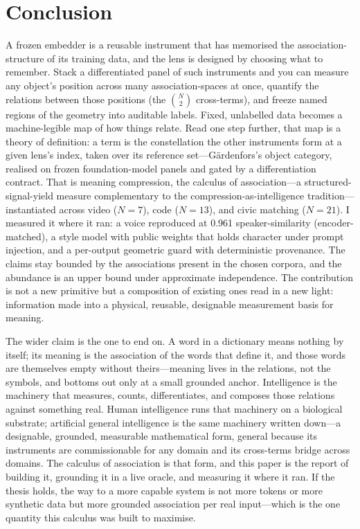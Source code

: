 \documentclass[10pt,twocolumn]{article}
\begin{document}
\section{Conclusion}
A frozen embedder is a reusable instrument that has memorised the
association-structure of its training data, and the lens is designed by choosing
what to remember. Stack a differentiated panel of such instruments and you can
measure any object's position across many association-spaces at once, quantify the
relations between those positions (the $\binom{N}{2}$ cross-terms), and freeze
named regions of the geometry into auditable labels. Fixed, unlabelled data
becomes a machine-legible map of how things relate. Read one step further, that
map is a theory of definition: a term is the constellation the other instruments
form at a given lens's index, taken over its reference set---G\"ardenfors's object
category, realised on frozen foundation-model panels and gated by a
differentiation contract. That is meaning compression,
the calculus of association---a structured-signal-yield measure complementary to
the compression-as-intelligence tradition---instantiated across video ($N=7$),
code ($N=13$), and civic matching ($N=21$). I
measured it where it ran: a voice reproduced at 0.961 speaker-similarity
(encoder-matched), a style model with public weights that holds character under
prompt injection, and a per-output geometric guard with deterministic provenance.
The claims stay bounded by the associations present in the chosen corpora, and the
abundance is an upper bound under approximate independence. The contribution is not
a new primitive but a composition of existing ones read in a new light: information
made into a physical, reusable, designable measurement basis for meaning.

The wider claim is the one to end on. A word in a dictionary means nothing by
itself; its meaning is the association of the words that define it, and those
words are themselves empty without theirs---meaning lives in the relations, not the
symbols, and bottoms out only at a small grounded anchor. Intelligence is the
machinery that measures, counts, differentiates, and composes those relations
against something real. Human intelligence runs that machinery on a biological
substrate; artificial general intelligence is the same machinery written down---a
designable, grounded, measurable mathematical form, general because its instruments
are commissionable for any domain and its cross-terms bridge across domains. The
calculus of association is that form, and this paper is the report of building it,
grounding it in a live oracle, and measuring it where it ran. If the thesis holds,
the way to a more capable system is not more tokens or more synthetic data but more
grounded association per real input---which is the one quantity this calculus was
built to maximise.
\end{document}

